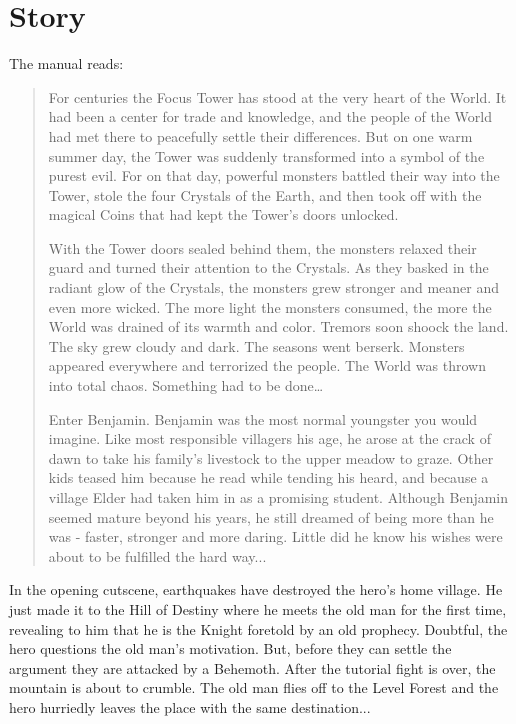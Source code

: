 \chapter{Story}

The manual reads:

\begin{quote}

For centuries the Focus Tower has stood at the very heart of the World. It had been a center for trade and knowledge, and the people of the World had met there to peacefully settle their differences. But on one warm summer day, the Tower was suddenly transformed into a symbol of the purest evil. For on that day, powerful monsters battled their way into the Tower, stole the four Crystals of the Earth, and then took off with the magical Coins that had kept the Tower’s doors unlocked.

With the Tower doors sealed behind them, the monsters relaxed their guard and turned their attention to the Crystals. As they basked in the radiant glow of the Crystals, the monsters grew stronger and meaner and even more wicked. The more light the monsters consumed, the more the World was drained of its warmth and color. Tremors soon shoock the land. The sky grew cloudy and dark. The seasons went berserk. Monsters appeared everywhere and terrorized the people. The World was thrown into total chaos. Something had to be done…
 
Enter Benjamin. Benjamin was the most normal youngster you would imagine. Like most responsible villagers his age, he arose at the crack of dawn to take his family’s livestock to the upper meadow to graze. Other kids teased him because he read while tending his heard, and because a village Elder had taken him in as a promising student. Although Benjamin seemed mature beyond his years, he still dreamed of being more than he was - faster, stronger and more daring. Little did he know his wishes were about to be fulfilled the hard way...

\end{quote}

In the opening cutscene, earthquakes have destroyed the hero’s home village. He just made it to the Hill of Destiny where he meets the old man for the first time, revealing to him that he is the Knight foretold by an old prophecy. Doubtful, the hero questions the old man’s motivation. But, before they can settle the argument they are attacked by a Behemoth. After the tutorial fight is over, the mountain is about to crumble. The old man flies off to the Level Forest and the hero hurriedly leaves the place with the same destination...

